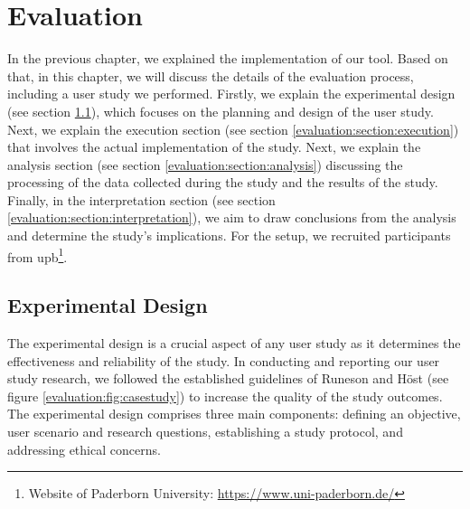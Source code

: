 
\chapter{Evaluation}
\label{chap:evaluation}
In the previous chapter, we explained the implementation of our tool. 
Based on that, in this chapter, we will discuss the details of the evaluation process, including a user study we performed. 
Firstly, we explain the experimental design (see section \ref{evaluation:section:design}), which focuses on the planning and design of the user study. 
Next, we explain the execution section (see section \ref{evaluation:section:execution}) that involves the actual implementation of the study. 
Next, we explain the analysis section (see section \ref{evaluation:section:analysis}) discussing the processing of the data collected during the study and the results of the study. 
Finally, in the interpretation section (see section \ref{evaluation:section:interpretation}), we aim to draw conclusions from the analysis and determine the study's implications.
For the setup, we recruited participants from \ac{upb}\footnote{Website of Paderborn University: \url{https://www.uni-paderborn.de/}}.
\ifpdf
    \graphicspath{{Chapters/Evaluation/Figs/}{Chapters/Evaluation/Figs/}{Chapters/Evaluation/Figs/}}
\else
    \graphicspath{{Chapters/Evaluation/Figs/}{Chapters/Evaluation/Figs/}}
\fi

\section{Experimental Design}
\label{evaluation:section:design}
The experimental design is a crucial aspect of any user study as it determines the effectiveness and reliability of the study.
In conducting and reporting our user study research, we followed the established guidelines of Runeson and Höst \cite{eval:guidlines:runeson} (see figure \ref{evaluation:fig:casestudy}) to increase the quality of the study outcomes.
The experimental design comprises three main components: defining an objective, user scenario and research questions, establishing a study protocol, and addressing ethical concerns.

